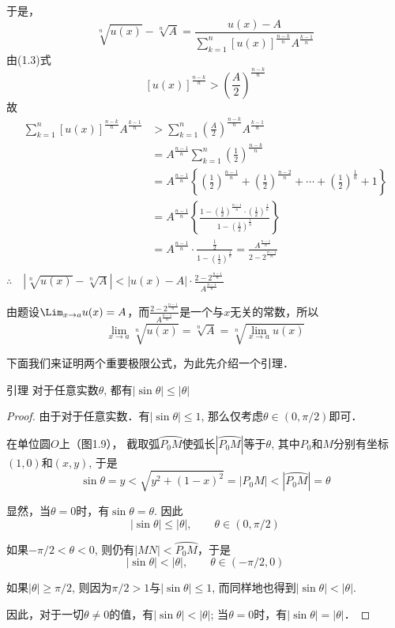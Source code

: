 于是，
\[\sqrt[n]{u(x)}-\sqrt[n]{A}=\frac{u(x)-A}{\sum^n_{k=1}[u(x)]^{\tfrac{n-k}{n}}A^{\tfrac{k-1}{n}}}\]
由(1.3)式
\[[u(x)]^{\tfrac{n-k}{n}}>\left(\frac{A}{2}\right)^{\tfrac{n-k}{n}}\]
故
\[\begin{split}
    \sum^n_{k=1}[u(x)]^{\tfrac{n-k}{n}}A^{\tfrac{k-1}{n}}&>\sum^n_{k=1}\left(\frac{A}{2}\right)^{\tfrac{n-k}{n}}A^{\tfrac{k-1}{n}}\\
    &=A^{\tfrac{n-1}{n}}\sum^n_{k=1}\left(\frac{1}{2}\right)^{\tfrac{n-k}{n}}\\
    &=A^{\tfrac{n-1}{n}}\left\{\left(\frac{1}{2}\right)^{\tfrac{n-1}{n}}+\left(\frac{1}{2}\right)^{\tfrac{n-2}{n}}+\cdots+\left(\frac{1}{2}\right)^{\tfrac{1}{n}}+1\right\}\\
    &=A^{\tfrac{n-1}{n}}\left\{\frac{1-\left(\frac{1}{2}\right)^{\tfrac{n-1}{n}}\cdot \left(\frac{1}{2}\right)^{\tfrac{1}{n}}}{1-\left(\frac{1}{2}\right)^{\tfrac{1}{n}}}\right\}\\
    &=A^{\tfrac{n-1}{n}}\cdot\frac{\frac{1}{2}}{1-\left(\frac{1}{2}\right)^{\tfrac{1}{n}}}=\frac{A^{\tfrac{n-1}{n}}}{2-2^{\tfrac{n-1}{n}}}\\
\end{split}\]
$\therefore\quad \left|\sqrt[n]{u(x)}-\sqrt[n]{A}\right|<|u(x)-A|\cdot \frac{2-2^{\tfrac{n-1}{n}}}{A^{\tfrac{n-1}{n}}}$

由题设$\Lim_{x\to a}u(x)=A$，而$\frac{2-2^{\tfrac{n-1}{n}}}{A^{\tfrac{n-1}{n}}}$是一个与$x$无关的常数，所以
\[\lim_{x\to a} \sqrt[n]{u(x)}=\sqrt[n]{A}=\sqrt[n]{\lim_{x\to a}u(x)}\]

下面我们来证明两个重要极限公式，为此先介绍一个引理．

\begin{blk}{引理}
     对于任意实数$\theta$, 都有$|\sin\theta|\le |\theta|$
\end{blk}

\begin{proof}
  由于对于任意实数．有$|\sin\theta|\le 1$, 那么仅考虑$\theta\in (0,\pi/2)$即可．
  
  在单位圆$O$上（图1.9），
 截取弧$\wideparen{P_0M}$使弧长$|\wideparen{P_0M}|$等于$\theta$, 其中$P_0$和$M$分别有坐标$(1, 0)$和$(x,y)$, 于是
 \[\sin\theta =y<\sqrt{y^2+ (1-x)^2} =|P_0M|<|\wideparen{P_0M}|=\theta\]
 
 显然，当$\theta=0$时，有$\sin\theta=\theta$. 因此
\[  |\sin\theta | \le |\theta|,\qquad  \theta\in  (0,\pi/2)\]

  如果$-\pi/2<\theta<0$, 则仍有$|MN|<\wideparen{P_0M}$，于是
\[|\sin\theta|<|\theta|,\qquad \theta\in (-\pi/2, 0) \]

  如果$|\theta|\ge \pi/2$, 则因为$\pi/2>1$与$|\sin\theta|\le 1$, 而同样地也得到$|\sin\theta|<|\theta|$. 
  
  因此，对于一切$\theta\ne 0$的值，有$|\sin\theta|<|\theta|$; 当$\theta=0$时，有$|\sin\theta|=|\theta|$．
\end{proof}



